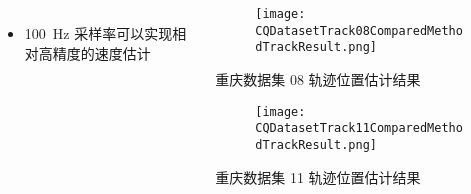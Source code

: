 \begin{frame}
\begin{columns}[t]
\begin{column}{0.6\textwidth}
{{\begin{tabular*}{1.2\linewidth}{@{\extracolsep{\fill}}clrrrrrrrrrrr}
					\bottomrule 
				\end{tabular*}
		   	}}
			\begin{itemize}
				\item \SI{100}{\hertz} 采样率可以实现相对高精度的速度估计
			\end{itemize}
		\end{column} 
		\begin{column}{0.4\textwidth}
    		\vspace{-3.2cm}  
		   	\begin{figure}
    			\texttt{[image: CQDatasetTrack08ComparedMethodTrackResult.png]}
		   	\end{figure}
		   	\vspace{-0.5cm}
		   	\hspace{0.5cm} {\tiny 重庆数据集 08 轨迹位置估计结果}
		   	\vspace{-0.2cm}
		   	\begin{figure}
				\texttt{[image: CQDatasetTrack11ComparedMethodTrackResult.png]}
		   	\end{figure}
		   	\vspace{-0.5cm}
		   	\hspace{0.5cm} {\tiny 重庆数据集 11 轨迹位置估计结果}
		\end{column}    
	\end{columns}
\end{frame}

